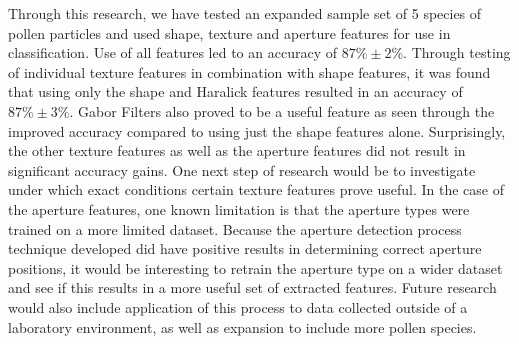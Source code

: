 \documentclass[runningheads,a4paper]{llncs}
\begin{document}
Through this research, we have tested an expanded sample set of 5 species of pollen particles and used shape, texture and aperture features for use in classification. Use of all features led to an accuracy of $87\% \pm 2\%$. Through testing of individual texture features in combination with shape features, it was found that using only the shape and Haralick features resulted in an accuracy of $87\% \pm 3\%$. Gabor Filters also proved to be a useful feature as seen through the improved accuracy compared to using just the shape features alone. Surprisingly, the other texture features as well as the aperture features did not result in significant accuracy gains. One next step of research would be to investigate under which exact conditions certain texture features prove useful. In the case of the aperture features, one known limitation is that the aperture types were trained on a more limited dataset. Because the aperture detection process technique developed did have positive results in determining correct aperture positions, it would be interesting to retrain the aperture type on a wider dataset and see if this results in a more useful set of extracted features. Future research would also include application of this process to data collected outside of a laboratory environment, as well as expansion to include more pollen species.
    
  
  
  
  
  


\end{document}
